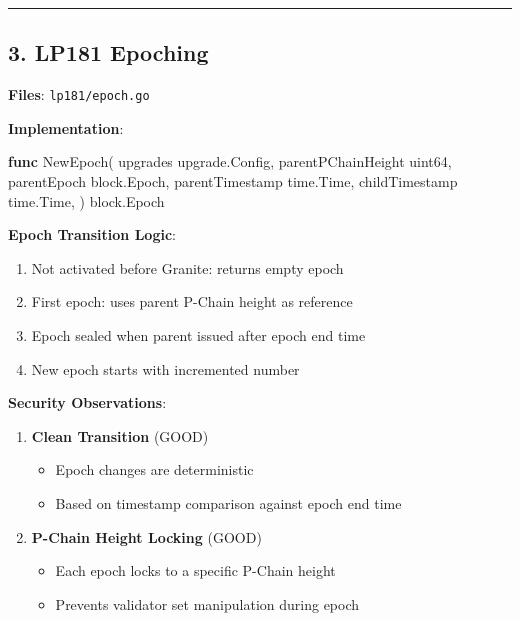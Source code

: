 \documentclass[
]{article}
\newenvironment{Shaded}{}{}
\newcommand{\DataTypeTok}[1]{\textcolor[rgb]{0.56,0.13,0.00}{#1}}
\newcommand{\KeywordTok}[1]{\textcolor[rgb]{0.00,0.44,0.13}{\textbf{#1}}}
\newcommand{\NormalTok}[1]{#1}
\newcommand{\OperatorTok}[1]{\textcolor[rgb]{0.40,0.40,0.40}{#1}}
\providecommand{\tightlist}{%
  \setlength{\itemsep}{0pt}\setlength{\parskip}{0pt}}
\begin{document}
\begin{center}\rule{0.5\linewidth}{0.5pt}\end{center}

\subsection{3. LP181 Epoching}\label{3-lp181-epoching}

\textbf{Files}: \texttt{lp181/epoch.go}

\textbf{Implementation}:

\begin{Shaded}
\begin{Highlighting}[]
\KeywordTok{func}\NormalTok{ NewEpoch}\OperatorTok{(}
\NormalTok{    upgrades upgrade}\OperatorTok{.}\NormalTok{Config}\OperatorTok{,}
\NormalTok{    parentPChainHeight }\DataTypeTok{uint64}\OperatorTok{,}
\NormalTok{    parentEpoch block}\OperatorTok{.}\NormalTok{Epoch}\OperatorTok{,}
\NormalTok{    parentTimestamp time}\OperatorTok{.}\NormalTok{Time}\OperatorTok{,}
\NormalTok{    childTimestamp time}\OperatorTok{.}\NormalTok{Time}\OperatorTok{,}
\OperatorTok{)}\NormalTok{ block}\OperatorTok{.}\NormalTok{Epoch}
\end{Highlighting}
\end{Shaded}

\textbf{Epoch Transition Logic}:

\begin{enumerate}
\def\labelenumi{\arabic{enumi}.}
\tightlist
\item
  Not activated before Granite: returns empty epoch
\item
  First epoch: uses parent P-Chain height as reference
\item
  Epoch sealed when parent issued after epoch end time
\item
  New epoch starts with incremented number
\end{enumerate}

\textbf{Security Observations}:

\begin{enumerate}
\def\labelenumi{\arabic{enumi}.}
\item
  \textbf{Clean Transition} (GOOD)

  \begin{itemize}
  \tightlist
  \item
    Epoch changes are deterministic
  \item
    Based on timestamp comparison against epoch end time
  \end{itemize}
\item
  \textbf{P-Chain Height Locking} (GOOD)

  \begin{itemize}
  \tightlist
  \item
    Each epoch locks to a specific P-Chain height
  \item
    Prevents validator set manipulation during epoch
  \end{itemize}
\end{enumerate}
\end{document}
